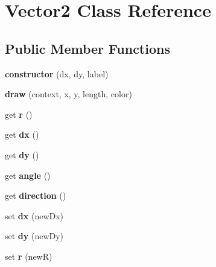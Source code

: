 \hypertarget{class_vector2}{}\section{Vector2 Class Reference}
\label{class_vector2}
\subsection*{Public Member Functions}
\begin{DoxyCompactItemize}
\item 
\mbox{\label{class_vector2_a7560313c3dc1803cb3cd388190316df8}} 
{\bfseries constructor} (dx, dy, label)
\item 
\mbox{\label{class_vector2_a41905c8ce3ef80600865afc79bffc3bb}} 
{\bfseries draw} (context, x, y, length, color)
\item 
\mbox{\label{class_vector2_a8af9aef333eb2db00bf2f31c53684e5b}} 
get {\bfseries r} ()
\item 
\mbox{\label{class_vector2_aecd730696b56c5b283c7b21018097edc}} 
get {\bfseries dx} ()
\item 
\mbox{\label{class_vector2_a452b681afc86c96a1fddccb4dc70364a}} 
get {\bfseries dy} ()
\item 
\mbox{\label{class_vector2_a6a48247b8e318386d1cf84916880c29f}} 
get {\bfseries angle} ()
\item 
\mbox{\label{class_vector2_af0f0d16d0b7011bad29f19b2f242ac54}} 
get {\bfseries direction} ()
\item 
\mbox{\label{class_vector2_a027b6d8a392e030161a210f3a0c65443}} 
set {\bfseries dx} (new\+Dx)
\item 
\mbox{\label{class_vector2_a523a94d35c89b5039fab49b8ca96fefe}} 
set {\bfseries dy} (new\+Dy)
\item 
\mbox{\label{class_vector2_a70255df9dc0863d52f49f062e3507d8a}} 
set {\bfseries r} (newR)
\item 
\mbox{\label{class_vector2_a2ada03ab6dd672d1ae3ff6b91c08471e}} 

\end{DoxyCompactItemize}
